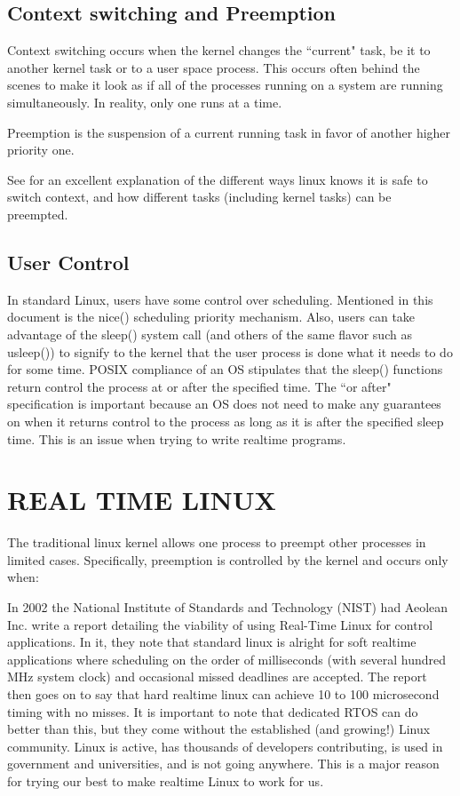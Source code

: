 \documentclass{article}
\begin{document}
\subsection{Context switching and Preemption}
Context switching occurs when the kernel changes the ``current" task, be it to another kernel task or to a user space process.  This occurs often behind the scenes to make it look as if all of the processes running on a system are running simultaneously.  In reality, only one runs at a time.

Preemption is the suspension of a current running task in favor of another higher priority one.

See \cite{LinuxProcessSwitch} for an excellent explanation of the different ways linux knows it is safe to switch context, and how different tasks (including kernel tasks) can be preempted.

\subsection{User Control}
In standard Linux, users have some control over scheduling.  Mentioned in this document is the nice() scheduling priority mechanism.  Also, users can take advantage of the sleep() system call (and others of the same flavor such as usleep()) to signify to the kernel that the user process is done what it needs to do for some time.  POSIX compliance of an OS stipulates that the sleep() functions return control the process at or after the specified time.  The ``or after" specification is important because an OS does not need to make any guarantees on when it returns control to the process as long as it is after the specified sleep time.  This is an issue when trying to write realtime programs.

\section{REAL TIME LINUX}
The traditional linux kernel allows one process to preempt other processes in limited cases.  Specifically, preemption is controlled by the kernel and occurs only when:

In 2002 the National Institute of Standards and Technology (NIST) had Aeolean Inc. write a report detailing the viability of using Real-Time Linux for control applications. \cite{IntroLinuxForRealTime}  In it, they note that standard linux is alright for soft realtime applications where scheduling on the order of milliseconds (with several hundred MHz system clock) and occasional missed deadlines are accepted.  The report then goes on to say that hard realtime linux can achieve 10 to 100 microsecond timing with no misses.  It is important to note that dedicated RTOS can do better than this, but they come without the established (and growing!) Linux community.  Linux is active, has thousands of developers contributing, is used in government and universities, and is not going anywhere.  This is a major reason for trying our best to make realtime Linux to work for us.
\end{document}
